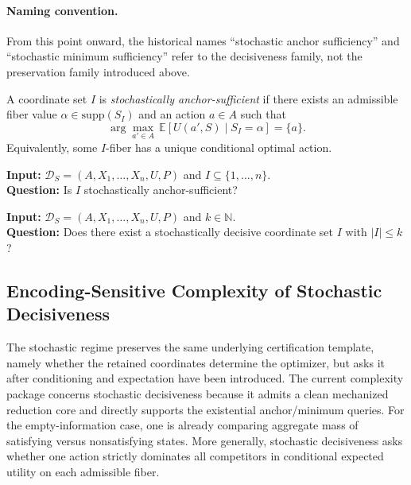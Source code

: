 \paragraph{Naming convention.}
From this point onward, the historical names ``stochastic anchor sufficiency'' and ``stochastic minimum sufficiency'' refer to the decisiveness family, not the preservation family introduced above.

\begin{definition}\label{def:stochastic-anchor-sufficient}
A coordinate set $I$ is \emph{stochastically anchor-sufficient} if there exists an admissible fiber value $\alpha \in \mathrm{supp}(S_I)$ and an action $a \in A$ such that
\[
\arg\max_{a'\in A}\,\mathbb{E}[U(a',S)\mid S_I = \alpha] = \{a\}.
\]
Equivalently, some $I$-fiber has a unique conditional optimal action.
\end{definition}

\begin{problem}\label{prob:stochastic-anchor-sufficiency}
\textbf{Input:} $\mathcal{D}_S=(A,X_1,\ldots,X_n,U,P)$ and $I\subseteq\{1,\ldots,n\}$. \\
\textbf{Question:} Is $I$ stochastically anchor-sufficient?
\end{problem}

\begin{problem}\label{prob:stochastic-minimum-sufficient}
\textbf{Input:} $\mathcal{D}_S=(A,X_1,\ldots,X_n,U,P)$ and $k\in\mathbb{N}$. \\
\textbf{Question:} Does there exist a stochastically decisive coordinate set $I$ with $|I|\le k$?
\end{problem}

\subsection{Encoding-Sensitive Complexity of Stochastic Decisiveness}

The stochastic regime preserves the same underlying certification template, namely whether the retained coordinates determine the optimizer, but asks it after conditioning and expectation have been introduced. The current complexity package concerns stochastic decisiveness because it admits a clean mechanized reduction core and directly supports the existential anchor/minimum queries. For the empty-information case, one is already comparing aggregate mass of satisfying versus nonsatisfying states. More generally, stochastic decisiveness asks whether one action strictly dominates all competitors in conditional expected utility on each admissible fiber.

